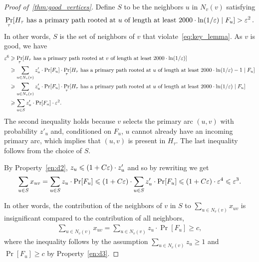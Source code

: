 \begin{proof}[Proof of~\cref{thm:good_vertices}]
	Define $S$ to be the neighbors $u$ in $N_{v}(v)$ satisfying
	\begin{align*}
	\Pr_{\tau}[\mbox{$H_\tau$ has a primary path rooted at $u$ of length at least $2000 \cdot \ln(1/\varepsilon)$} \mid F_u] > \varepsilon^2\,.
	\end{align*}
	In other words, $S$ is the set of neighbors of $v$ that violate~\eqref{eq:key_lemma}.
	As $v$ is good, we have 
	\begin{align*}
	\varepsilon^6 &\geqslant \Pr_{\tau}[\mbox{$H_\tau$ has a primary path rooted at $v$ of length at least $2000 \cdot \ln(1/\varepsilon)$}] \\
	&  \geqslant \sum_{u\in N_v(v)} z_u' \cdot \Pr[F_u] \cdot \Pr_{\tau} [\mbox{$H_\tau$ has a primary path rooted at $u$ of length at least $2000 \cdot \ln(1/\varepsilon)-1$} \mid F_u] \\ 
	&  \geqslant \sum_{u\in N_v(v)} z_u' \cdot \Pr[F_u] \cdot \Pr_{\tau} [\mbox{$H_\tau$ has a primary path rooted at $u$ of length at least $2000 \cdot  \ln(1/\varepsilon)$} \mid F_u] \\
	& \geqslant \sum_{u\in S} z_u' \cdot \Pr[F_u] \cdot \varepsilon^2.
	\end{align*}
	The second inequality holds because $v$ selects the primary arc $(u,v)$ with probability $z'_u$ and, conditioned on $F_u$, $u$ cannot already have an incoming primary arc, which implies that $(u,v)$ is present in $H_\tau$. The last inequality follows from the choice of $S$.
	
	By Property~\eqref{en:d2}, $z_u \leqslant (1+C\varepsilon) \cdot z'_u$ and so by rewriting we get
	\begin{align*}
	\sum_{u\in S} x_{uv} = \sum_{u\in S} z_u \cdot \Pr[F_u] \leqslant  (1+C\varepsilon) \cdot \sum_{u\in S} z'_u \cdot \Pr[F_u] \leqslant (1+C\varepsilon) \cdot \varepsilon^4 \leqslant \varepsilon^3.
	\end{align*}
	
	In other words, the contribution of the neighbors of $v$ in $S$ to $\sum_{u\in N_v(v)} x_{uv}$ is insignificant compared to the contribution of all neighbors, 
	\begin{align}
	\sum_{u\in N_v(v)} x_{uv}  = \sum_{u\in N_v(v)} z_u  \cdot \Pr[F_u] \geq c, 
	\label{eq:total_large}
	\end{align}
	where the inequality follows by the assumption $\sum_{u\in N_v(v)} z_u \geq 1$ and $\Pr[F_u] \geq c$ by Property~\eqref{en:d3}.
	

\end{proof}

